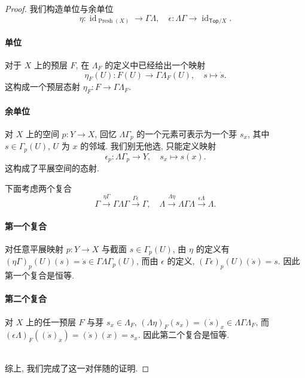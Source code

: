 \begin{proof}
    我们构造单位与余单位
    $$\eta \colon \operatorname{id}_{\operatorname{Presh}(X)} \to \Gamma\Lambda,\quad \epsilon \colon \Lambda\Gamma \to \operatorname{id}_{\mathsf {Top}/X}.$$

	\paragraph{单位}
	对于 $X$ 上的预层 $F$, 在 $\Lambda_F$ 的定义中已经给出一个映射
	$$
		\eta_F(U) \colon F(U) \to \Gamma\Lambda_F (U),\quad
		s\mapsto \dot s.
	$$
	这构成一个预层态射
	$\eta_F \colon F \to \Gamma\Lambda_F$. %
	\paragraph{余单位}
	对 $X$ 上的空间 $p \colon Y \to X$,
	回忆 $\Lambda \Gamma_p$ 的一个元素可表示为一个芽 $s_x$, 其中
	$s\in \Gamma_p (U)$, $U$ 为 $x$ 的邻域.
	我们别无他选, 只能定义映射
	$$
		\epsilon_p \colon \Lambda \Gamma_p \to Y,\quad
		s_x \mapsto s(x).
	$$
	这构成了平展空间的态射. %
	
    下面考虑两个复合
    $$
    \Gamma \overset{\eta \Gamma}{\longrightarrow} \Gamma\Lambda\Gamma \overset{\Gamma\epsilon}{\longrightarrow} \Gamma,
    \quad
    \Lambda \overset{\Lambda\eta}{\longrightarrow} \Lambda\Gamma\Lambda \overset{\epsilon\Lambda}{\longrightarrow} \Lambda.
    $$

	\paragraph{第一个复合}
	对任意平展映射 $p \colon Y \to X$ 与截面 $s \in \Gamma_p(U)$,
    由 $\eta$ 的定义有
    $(\eta\Gamma)_p (U)(s) = \dot s \in \Gamma\Lambda\Gamma_p(U)$,
    而由 $\epsilon$ 的定义,
    $(\Gamma\epsilon)_p(U)(\dot s) = s$.
    因此第一个复合是恒等.

    \paragraph{第二个复合}
    对 $X$ 上的任一预层 $F$
    与芽 $s_x\in \Lambda_F$,
    $(\Lambda\eta)_F(s_x) = (\dot s)_x \in \Lambda\Gamma\Lambda_F$,
    而 $(\epsilon\Lambda)_F((\dot s)_x) = (\dot s)(x) = s_x$.
    因此第二个复合是恒等.
    
    ~\\
    
    综上, 我们完成了这一对伴随的证明.
\end{proof}

